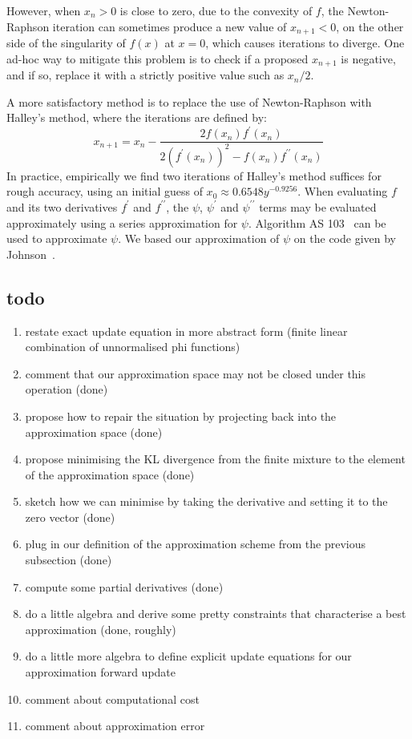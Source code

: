 \documentclass[twoside, 11pt]{article}
\begin{document}
However, when $x_n > 0$ is close to zero, due to the convexity of $f$, the Newton-Raphson iteration can sometimes produce a new value of $x_{n+1} < 0$, on the other side of the singularity of $f(x)$ at $x=0$, which causes iterations to diverge. One ad-hoc way to mitigate this problem is to check if a proposed $x_{n+1}$ is negative, and if so, replace it with a strictly positive value such as $x_n / 2$.

A more satisfactory method is to replace the use of Newton-Raphson with Halley's method, where the iterations are defined by:
\begin{equation}
x_{n+1}
=
x_n - \frac{
2 f(x_n) f^{\prime}(x_n)
}{
2 \left( f^{\prime}(x_n) \right)^2 - f(x_n) f^{\prime \prime}(x_n)} \nonumber
\end{equation}
In practice, empirically we find two iterations of Halley's method suffices for rough accuracy, using an initial guess of $x_0 \approx 0.6548 y^{-0.9256}$. When evaluating $f$ and its two derivatives $f^{\prime}$ and $f^{\prime\prime}$, the $\psi$, $\psi^{\prime}$ and $\psi^{\prime\prime}$ terms may be evaluated approximately using a series approximation for $\psi$. Algorithm AS 103~\citet{bernardo1976algorithm} can be used to approximate $\psi$. We based our approximation of $\psi$ on the code given by Johnson~\citep{JohnsonDigammaC}.

\subsection{todo}

\begin{enumerate}
\item restate exact update equation in more abstract form (finite linear combination of unnormalised phi functions)
\item comment that our approximation space may not be closed under this operation (done)
\item propose how to repair the situation by projecting back into the approximation space (done)
\item propose minimising the KL divergence from the finite mixture to the element of the approximation space (done)
\item sketch how we can minimise by taking the derivative and setting it to the zero vector (done)
\item plug in our definition of the approximation scheme from the previous subsection (done)
\item compute some partial derivatives (done)
\item do a little algebra and derive some pretty constraints that characterise a best approximation (done, roughly)
\item do a little more algebra to define explicit update equations for our approximation forward update
\item comment about computational cost
\item comment about approximation error
\end{enumerate}
\end{document}
